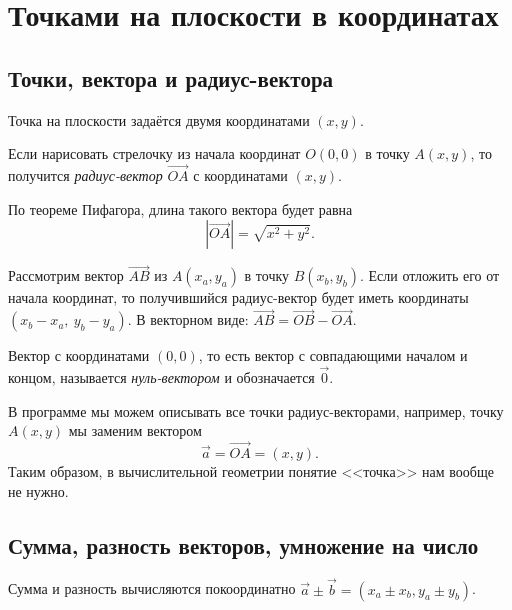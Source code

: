 \documentclass[a4paper,12pt]{article}
\newcommand{\ora}{\overrightarrow}
\def\v{\vec}
\def\vv{\ora}
\begin{document}
\setcounter{tocdepth}{7}
\tableofcontents
\newpage

  \section{Точками на плоскости в координатах}
    \subsection{Точки, вектора и радиус-вектора}

    Точка на плоскости задаётся двумя координатами $(x, y)$.

    Если нарисовать стрелочку из начала координат $O(0, 0)$ в точку $A(x, y)$, то получится \emph{радиус-вектор} $\vv{OA}$ с координатами $(x, y)$.
    
    По теореме Пифагора, длина такого вектора будет равна
    \[|\vv{OA}| = \sqrt{x^2 + y^2}.\]
    
    Рассмотрим вектор $\vv{AB}$ из $A(x_a, y_a)$ в точку $B(x_b, y_b)$.
    Если отложить его от начала координат, то получившийся радиус-вектор будет иметь координаты $(x_b - x_a,\ y_b - y_a)$. В векторном виде: $\vv{AB} = \vv{OB} - \vv{OA}$.
    

    Вектор с координатами $(0, 0)$, то есть вектор с совпадающими началом и концом, называется \emph{нуль-вектором} и обозначается $\v 0$.
    
    В программе мы можем описывать все точки радиус-векторами, например, точку $A(x, y)$ мы заменим вектором \[\v a = \vv{OA} = (x, y).\] Таким образом, в вычислительной геометрии  понятие <<точка>> нам вообще не нужно.
    
    \subsection{Сумма, разность векторов, умножение на число}
    
    Сумма и разность вычисляются покоординатно $\v a \pm \v b = (x_a \pm x_b, y_a \pm y_b)$.
    
\end{document}
